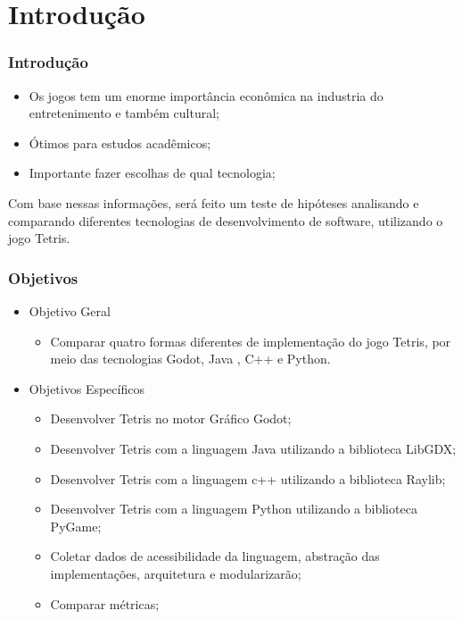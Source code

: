 \section{Introdução}

\begin{frame}

    \frametitle{Introdução}

    \begin{itemize}
    	\item Os jogos tem um enorme importância econômica na industria do entretenimento e também cultural;
    	\item Ótimos para estudos acadêmicos;
    	\item Importante fazer escolhas de qual tecnologia;
    \end{itemize}
    
    Com base nessas informações, será feito um teste de hipóteses analisando e comparando diferentes tecnologias de desenvolvimento de software, utilizando o jogo Tetris.

\end{frame}


\begin{frame}

    \frametitle{Objetivos}

    \begin{itemize}
    
        \item Objetivo Geral
            \begin{itemize}
                \item Comparar quatro formas diferentes de implementação do jogo Tetris, por meio das
                tecnologias Godot, Java , C++ e Python.
            \end{itemize}
            
        \item Objetivos Específicos
            \begin{itemize}
                \item Desenvolver Tetris no motor Gráfico Godot;
                \item Desenvolver Tetris com a linguagem Java utilizando a biblioteca LibGDX;
                \item Desenvolver Tetris com a linguagem c++ utilizando a biblioteca Raylib;
                \item Desenvolver Tetris com a linguagem Python utilizando a biblioteca PyGame;
                \item Coletar dados de acessibilidade da linguagem, abstração das implementações, arquitetura e modularizarão;
                \item  Comparar métricas;
            \end{itemize}
            
    \end{itemize}

\end{frame}